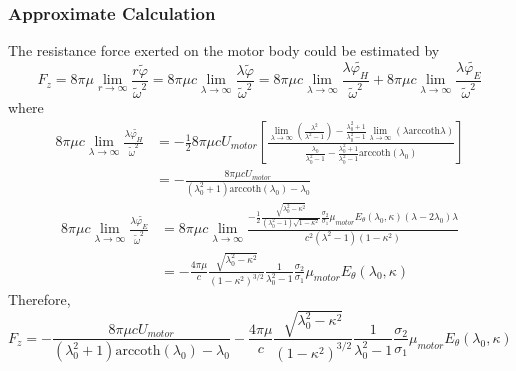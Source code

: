 \documentclass[fontsize=11pt, %
                             paper=a4, %
                             twoside, %
                             captions=tableheading,
                             index=totoc,
                             hyperref]{labbook}
\begin{document}
\subsubsection{Approximate Calculation}
The resistance force exerted on the motor body could be estimated by
\begin{equation}
F_z=8\pi\mu\lim_{r\to\infty}\frac{r\tilde\varphi}{\tilde{\omega}^2}=8\pi\mu c\lim_{\lambda\to\infty}\frac{\lambda\tilde\varphi}{\tilde{\omega}^2}=8\pi\mu c\lim_{\lambda\to\infty}\frac{\lambda\tilde{\varphi_H}}{\tilde{\omega}^2}+8\pi\mu c\lim_{\lambda\to\infty}\frac{\lambda\tilde{\varphi_E}}{\tilde{\omega}^2}
\end{equation}
where
\begin{equation}
\begin{aligned}
8\pi\mu c\lim_{\lambda\to\infty}\frac{\lambda\tilde{\varphi_H}}{\tilde{\omega}^2}&=-\frac{1}{2}8\pi\mu c U_{motor}\left[\frac{\lim_{\lambda\to\infty}\left(\frac{\lambda^2}{\lambda^2-1}\right)-\frac{\lambda_0^2+1}{\lambda_0^2-1}\lim_{\lambda\to\infty}\left(\lambda\mathrm{arccoth}\lambda\right)}{\frac{\lambda_0}{\lambda_0^2-1}-\frac{\lambda_0^2+1}{\lambda_0^2-1}\mathrm{arccoth}(\lambda_0)}\right]\\
&=-\frac{8\pi\mu c U_{motor}}{(\lambda_0^2+1)\mathrm{arccoth}(\lambda_0)-\lambda_0}
\end{aligned}
\end{equation}
\begin{equation}
\begin{aligned}
8\pi\mu c\lim_{\lambda\to\infty}\frac{\lambda\tilde{\varphi_E}}{\tilde{\omega}^2}&=8\pi\mu c\lim_{\lambda\to\infty}\frac{-\frac{1}{2}\frac{\sqrt{\lambda_0^2-\kappa^2}}{(\lambda_0^2-1)\sqrt{1-\kappa^2}}\frac{\sigma_2}{\sigma_1}\mu_{motor}E_\theta(\lambda_0,\kappa)(\lambda-2\lambda_0)\lambda}{c^2(\lambda^2-1)(1-\kappa^2)}\\
&=-\frac{4\pi\mu}{c}\frac{\sqrt{\lambda_0^2-\kappa^2}}{(1-\kappa^2)^{3/2}}\frac{1}{\lambda_0^2-1}\frac{\sigma_2}{\sigma_1}\mu_{motor}E_\theta(\lambda_0,\kappa)
\end{aligned}
\end{equation}
Therefore,
\begin{equation}
F_z=-\frac{8\pi\mu c U_{motor}}{(\lambda_0^2+1)\mathrm{arccoth}(\lambda_0)-\lambda_0}-\frac{4\pi\mu}{c}\frac{\sqrt{\lambda_0^2-\kappa^2}}{(1-\kappa^2)^{3/2}}\frac{1}{\lambda_0^2-1}\frac{\sigma_2}{\sigma_1}\mu_{motor}E_\theta(\lambda_0,\kappa)
\end{equation}
\end{document}
